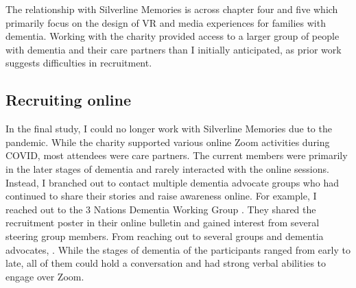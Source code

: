The relationship with Silverline Memories is across chapter four and five which primarily focus on the design of VR and media experiences for families with dementia. Working with the charity provided access to a larger group of people with dementia and their care partners than I initially anticipated, as prior work suggests difficulties in recruitment. 

\subsection{Recruiting online}
\label{Method:RecruitOnline}
In the final study, I could no longer work with Silverline Memories due to the pandemic. While the charity supported various online Zoom activities during COVID, most attendees were care partners. The current members were primarily in the later stages of dementia and rarely interacted with the online sessions. Instead, I branched out to contact multiple dementia advocate groups who had continued to share their stories and raise awareness online. For example, I reached out to the 3 Nations Dementia Working Group \citep{working_group_2022}. They shared the recruitment poster in their online bulletin and gained interest from several steering group members. From reaching out to several groups and dementia advocates, . While the stages of dementia of the participants ranged from early to late, all of them could hold a conversation and had strong verbal abilities to engage over Zoom.

